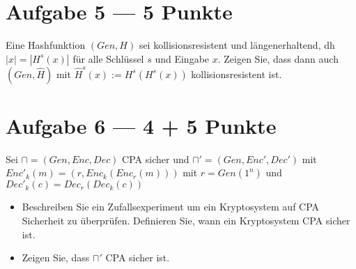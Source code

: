 \documentclass{../crypto_2}
\begin{document}
\section*{Aufgabe 5 --- 5 Punkte}
Eine Hashfunktion $(Gen,H)$ sei kollisionsresistent und längenerhaltend, dh $|x| = |H^s (x)|$ für alle Schlüssel $s$ und Eingabe $x$. Zeigen Sie, dass dann auch $(Gen,\hat{H})$ mit $\hat{H}^s (x):=H^s(H^s(x))$ kollisionsresistent ist. 
\section*{Aufgabe 6 --- 4 + 5 Punkte}
Sei $\sqcap = (Gen, Enc, Dec)$ CPA sicher und $\sqcap' = (Gen, Enc', Dec')$ mit $Enc'_k(m) = (r,Enc_k(Enc_r(m)))$ mit $r=Gen(1^n)$ und $Dec'_k(c)= Dec_r(Dec_k(c))$ 
\begin{itemize}
\item Beschreiben Sie ein Zufallsexperiment um ein Kryptosystem auf CPA Sicherheit zu 	   überprüfen. Definieren Sie, wann ein Kryptosystem CPA sicher ist.
\item Zeigen Sie, dass $\sqcap'$ CPA sicher ist.
\end{itemize}
\end{document}

